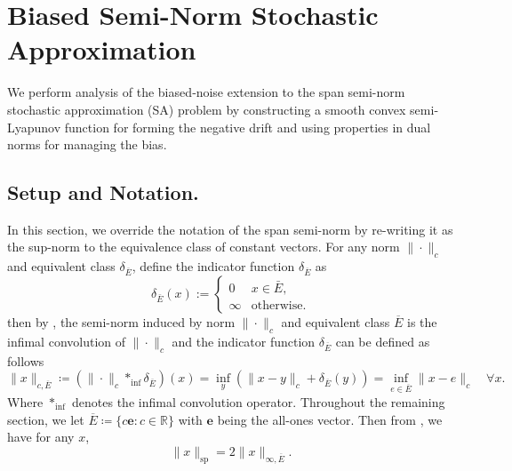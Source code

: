 \section{Biased Semi-Norm Stochastic Approximation} \label{proofbiasedSA}


We perform analysis of the biased‐noise extension to the span semi-norm stochastic approximation (SA) problem by constructing a smooth convex semi-Lyapunov function for forming the negative drift \citep{zhang2021finite} and using properties in dual norms for managing the bias.
\medskip

\noindent
\subsection{Setup and Notation.} \label{setups}

In this section, we override the notation of the span semi-norm by re-writing it as the sup-norm to the equivalence class of constant vectors. For any norm $\|\cdot\|_c$ and equivalent class $\delta_{\overline{E}}$, define the indicator function  $\delta_{\overline{E}}$ as
\begin{equation}
\delta_{\bar{E}}(x) := 
\begin{cases} 
    0 & x \in \bar{E}, \\
    \infty & \text{{otherwise}.}
\end{cases}
\end{equation}
\noindent then by \citep{zhang2021finite}, the semi-norm induced by norm  $\|\cdot\|_c$  and equivalent class $\overline{E}$ is the infimal convolution of $\|\cdot\|_c$ and the indicator function $\delta_{\overline{E}}$ can be defined as follows 
\begin{equation}
    \|x\|_{c,\overline{E}} \coloneqq (\|\cdot\|_c \ast_{\inf} \delta_{\overline{E}})(x) = \inf_y  (\|x-y\|_c + \delta_{\overline{E}}(y))= \inf_{e\in\overline{E}} \|x-e\|_c \quad \forall x.
\end{equation}
Where $\ast_{\inf}$ denotes the infimal convolution operator. Throughout the remaining section, we let $\overline{E}\coloneqq \{c \mathbf{e} : c \in \mathbb{R}\}$ with $\mathbf{e}$ being the all-ones vector. Then from \citep{gupta2015empirical}, we have for any $x$,
\begin{equation} \label{eq:span2iniftynorm}
    \|x\|_{\mathrm{sp}} = 2 \|x\|_{\infty,\overline{E}}.
\end{equation}

